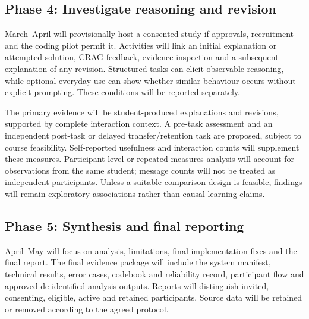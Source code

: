 \documentclass[11pt,a4paper]{article}
\begin{document}
\subsection{Phase 4: Investigate reasoning and revision}
March--April will provisionally host a consented study if approvals, recruitment and the coding pilot permit it. Activities will link an initial explanation or attempted solution, CRAG feedback, evidence inspection and a subsequent explanation of any revision. Structured tasks can elicit observable reasoning, while optional everyday use can show whether similar behaviour occurs without explicit prompting. These conditions will be reported separately.

The primary evidence will be student-produced explanations and revisions, supported by complete interaction context. A pre-task assessment and an independent post-task or delayed transfer/retention task are proposed, subject to course feasibility. Self-reported usefulness and interaction counts will supplement these measures. Participant-level or repeated-measures analysis will account for observations from the same student; message counts will not be treated as independent participants. Unless a suitable comparison design is feasible, findings will remain exploratory associations rather than causal learning claims.

\subsection{Phase 5: Synthesis and final reporting}
April--May will focus on analysis, limitations, final implementation fixes and the final report. The final evidence package will include the system manifest, technical results, error cases, codebook and reliability record, participant flow and approved de-identified analysis outputs. Reports will distinguish invited, consenting, eligible, active and retained participants. Source data will be retained or removed according to the agreed protocol.
\end{document}
